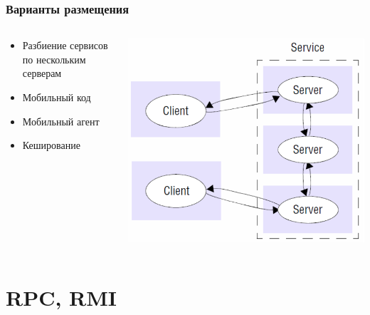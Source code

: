 \documentclass{../../slides-style}
\begin{document}
    \begin{frame}
        \frametitle{Варианты размещения}
        \begin{columns}
            \begin{column}{0.6\textwidth}
                \begin{itemize}
                    \item Разбиение сервисов по нескольким серверам
                    \item Мобильный код
                    \item Мобильный агент
                    \item Кеширование
                \end{itemize}
            \end{column}
            \begin{column}{0.4\textwidth}
                \begin{center}
                    \includegraphics[width=\textwidth]{clientServer.png}
                \end{center}
            \end{column}
        \end{columns}
    \end{frame}

    \section{RPC, RMI}
\end{document}
